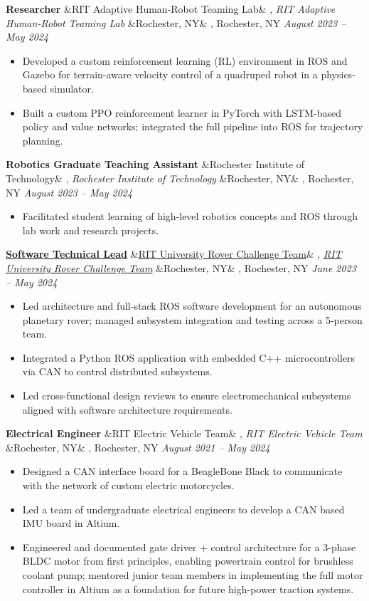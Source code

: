 \documentclass[letterpaper,10pt]{article}
\newcommand{\experience}[5]{%
    \noindent\textbf{#1}%
    \ifx&#2&
    \else
        , \textit{#2}%
    \fi
    \ifx&#3&
    \else
        , #3%
    \fi
    \hfill \textit{#4} \\
    \vspace{-6.8mm}%
    \begin{itemize}[itemsep=-5pt]
        \setlength{\itemindent}{0em}
        #5
    \end{itemize}
    \vspace{1mm}
}
\begin{document}
\experience
    {Researcher}
    {RIT Adaptive Human-Robot Teaming Lab}
    {Rochester, NY}
    {August 2023 – May 2024}
    {
        \item  Developed a custom reinforcement learning (RL) environment in ROS and Gazebo for terrain-aware velocity control of a quadruped robot in a physics-based simulator.
        \item  Built a custom PPO reinforcement learner in PyTorch with LSTM-based policy and value networks; integrated the full pipeline into ROS for trajectory planning.
    }
    
\experience
    {Robotics Graduate Teaching Assistant}
    {Rochester Institute of Technology}
    {Rochester, NY}
    {August 2023 – May 2024}
    {
        \item  Facilitated student learning of high-level robotics concepts and ROS through lab work and research projects.
    }

\experience
    {\href{https://ryanbarry.me/projects/robotics/rover/}{Software Technical Lead}}
    {\href{https://ryanbarry.me/projects/robotics/rover/}{RIT University Rover Challenge Team}}
    {Rochester, NY}
    {June 2023 – May 2024}
    {
        \item Led architecture and full-stack ROS software development for an autonomous planetary rover; managed subsystem integration and testing across a 5-person team.
        \item Integrated a Python ROS application with embedded C++ microcontrollers via CAN to control distributed subsystems.
        \item Led cross-functional design reviews to ensure electromechanical subsystems aligned with software architecture requirements.
    }

\experience
    {Electrical Engineer}
    {RIT Electric Vehicle Team}
    {Rochester, NY}
    {August 2021 – May 2024}
    {
        \item Designed a CAN interface board for a BeagleBone Black to communicate with the network of custom electric motorcycles.
        \item Led a team of undergraduate electrical engineers to develop a CAN based IMU board in Altium. 
        \item Engineered and documented gate driver + control architecture for a 3-phase BLDC motor from first principles, enabling powertrain control for brushless coolant pump; mentored junior team members in implementing the full motor controller in Altium as a foundation for future high-power traction systems.

    }
\end{document}
